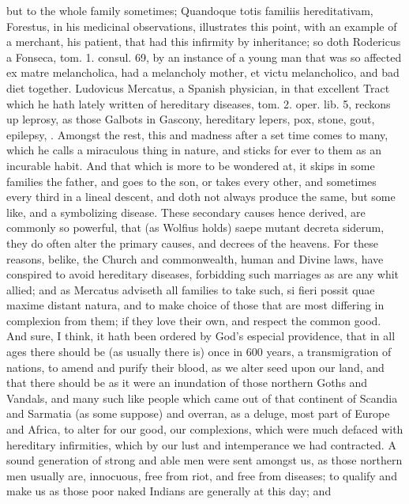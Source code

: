 {but to the whole family sometimes; Quandoque totis familiis
hereditativam, Forestus, in his medicinal observations,
illustrates this point, with an example of a merchant, his patient,
that had this infirmity by inheritance; so doth Rodericus a Fonseca,
tom. 1. consul. 69, by an instance of a young man that was so affected
ex matre melancholica, had a melancholy mother, et victu melancholico,
and bad diet together. Ludovicus Mercatus, a Spanish physician, in that
excellent Tract which he hath lately written of hereditary diseases,
tom. 2. oper. lib. 5, reckons up leprosy, as those Galbots in
Gascony, hereditary lepers, pox, stone, gout, epilepsy, \etc{}. Amongst the
rest, this and madness after a set time comes to many, which he calls a
miraculous thing in nature, and sticks for ever to them as an incurable
habit. And that which is more to be wondered at, it skips in some
families the father, and goes to the son, or takes every other,
and sometimes every third in a lineal descent, and doth not always
produce the same, but some like, and a symbolizing disease. These
secondary causes hence derived, are commonly so powerful, that (as
Wolfius holds) saepe mutant decreta siderum, they do often alter
the primary causes, and decrees of the heavens. For these reasons,
belike, the Church and commonwealth, human and Divine laws, have
conspired to avoid hereditary diseases, forbidding such marriages as
are any whit allied; and as Mercatus adviseth all families to take
such, si fieri possit quae maxime distant natura, and to make choice of
those that are most differing in complexion from them; if they love
their own, and respect the common good. And sure, I think, it hath been
ordered by God's especial providence, that in all ages there should be
(as usually there is) once in 600 years, a transmigration of
nations, to amend and purify their blood, as we alter seed upon our
land, and that there should be as it were an inundation of those
northern Goths and Vandals, and many such like people which came out of
that continent of Scandia and Sarmatia (as some suppose) and overran,
as a deluge, most part of Europe and Africa, to alter for our good, our
complexions, which were much defaced with hereditary infirmities, which
by our lust and intemperance we had contracted. A sound generation of
strong and able men were sent amongst us, as those northern men usually
are, innocuous, free from riot, and free from diseases; to qualify and
make us as those poor naked Indians are generally at this day; and
}
